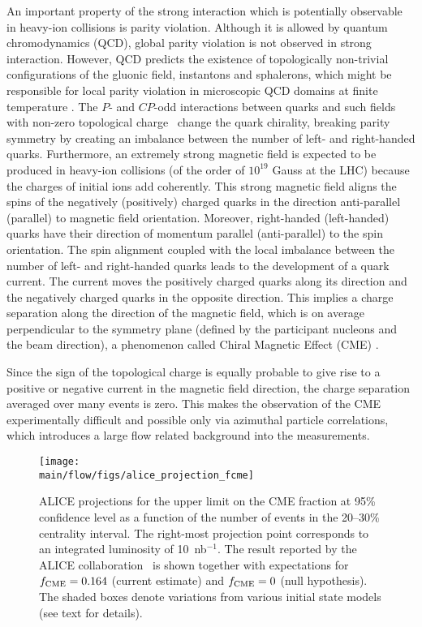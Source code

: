 An important property of the strong interaction which is potentially observable in heavy-ion collisions is parity violation. Although it is allowed by 
quantum chromodynamics (QCD), global parity violation is not observed in strong interaction. However, QCD predicts the existence of topologically 
non-trivial configurations of the gluonic field, instantons and sphalerons, which might be responsible for local parity violation in microscopic QCD 
domains at finite temperature \cite{Lee:1973iz, Lee:1974ma, Morley:1983wr, Kharzeev:1998kz}. The $P$- and $CP$-odd interactions between quarks 
and such fields with non-zero topological charge~\cite{Chern:1974ft} change the quark chirality, breaking parity symmetry by creating an imbalance 
between the number of left- and right-handed quarks. Furthermore, an extremely strong magnetic field is expected to be produced in heavy-ion collisions 
\cite{Deng:2012pc, Gursoy:2014aka} (of the order of $10^{19}$ Gauss at the LHC) because the charges of initial ions add coherently. This strong 
magnetic field aligns the spins of the negatively (positively) charged quarks in the direction anti-parallel (parallel) to magnetic field orientation. Moreover, 
right-handed (left-handed) quarks have their direction of momentum parallel (anti-parallel) to the spin orientation. The spin alignment coupled with the 
local imbalance between the number of left- and right-handed quarks leads to the development of a quark current. The current moves the positively 
charged quarks along its direction and the negatively charged quarks in the opposite direction. This implies a charge separation along the direction 
of the magnetic field, which is on average perpendicular to the symmetry plane (defined by the participant nucleons and the beam direction), a 
phenomenon called Chiral Magnetic Effect (CME) \cite{Kharzeev:2004ey, Kharzeev:2007tn, Kharzeev:2007jp, Fukushima:2008xe}. 

Since the sign of 
the topological charge is equally probable to give rise to a positive or negative current in the magnetic field direction, the charge separation averaged 
over many events is zero. This makes the observation of the CME experimentally difficult and possible only via azimuthal particle correlations, which 
introduces a large flow related background into the measurements.

\begin{figure}[!ht]
\begin{center}
\texttt{[image: \\main/flow/figs/alice\_projection\_fcme]}
\caption{
ALICE projections for the upper limit on the CME fraction at 95\% confidence 
  level as a function of the number of events in the 20--30\% 
  centrality interval.
The right-most projection point corresponds to an integrated luminosity 
  of 10~nb$^{-1}$.
The result reported by the ALICE collaboration~\cite{Acharya:2017fau} 
  is shown together with expectations for $f_{\rm CME}=0.164$ (current estimate) 
  and $f_{\rm CME}=0$ (null hypothesis). 
The shaded boxes denote variations from various initial 
  state models (see text for details).
}
\label{fig:alice_fcme}
\end{center}
\end{figure}

